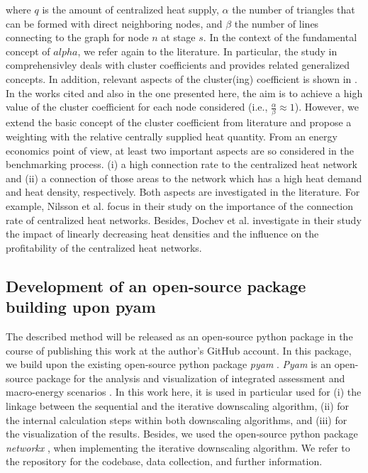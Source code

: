 where $q$ is the amount of centralized heat supply, $\alpha$ the number of triangles that can be formed with direct neighboring nodes, and $\beta$ the number of lines connecting to the graph for node $n$ at stage $s$. In the context of the fundamental concept of $alpha$, we refer again to the literature. In particular, the study in \cite{huang2010link} comprehensivley deals with cluster coefficients and provides related generalized concepts. In addition, relevant aspects of the cluster(ing) coefficient is shown in \cite{cui2014detecting}. In the works cited and also in the one presented here, the aim is to achieve a high value of the cluster coefficient for each node considered (i.e., $\frac{\alpha}{\beta} \approx 1$). However, we extend the basic concept of the cluster coefficient from literature and propose a weighting with the relative centrally supplied heat quantity. From an energy economics point of view, at least two important aspects are so considered in the benchmarking process. (i) a high connection rate to the centralized heat network and (ii) a connection of those areas to the network which has a high heat demand and heat density, respectively. Both aspects are investigated in the literature. For example, Nilsson et al. \cite{nilsson2008sparse} focus in their study on the importance of the connection rate of centralized heat networks. Besides, Dochev et al. \cite{dochev2018analysing} investigate in their study the impact of linearly decreasing heat densities and the influence on the profitability of the centralized heat networks.

\subsection{Development of an open-source package building upon pyam}\label{open}
The described method will be released as an open-source python package in the course of publishing this work at the author's GitHub account. In this package, we build upon the existing open-source python package \textit{pyam} \cite{gidden2019pyam}. \textit{Pyam} is an open-source package for the analysis and visualization of integrated assessment and macro-energy scenarios \cite{huppmann2021pyam}. In this work here, it is used in particular used for (i) the linkage between the sequential and the iterative downscaling algorithm, (ii) for the internal calculation steps within both downscaling algorithms, and (iii) for the visualization of the results. Besides, we used the open-source python package \textit{networkx} \cite{hagberg2008exploring}, when implementing the iterative downscaling algorithm. We refer to the repository for the codebase, data collection, and further information. 
